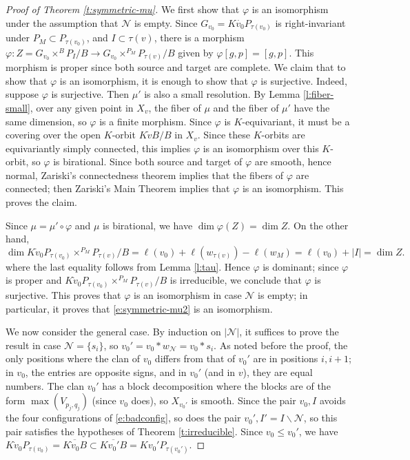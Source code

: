 \documentclass[11pt,letterpaper,reqno]{amsart}
\newcommand{\cN}{\mathcal N}
\numberwithin{equation}{section}
\theoremstyle{plain}
\theoremstyle{definition}
\theoremstyle{remark}
\begin{document}
\begin{proof}[Proof of Theorem \ref{t:symmetric-mu}]
We first show that $\varphi$ is an isomorphism under the assumption that $\cN$ is empty.  
Since $G_{v_0} = K \dot{v_0} P_{\tau(v_0)}$  is right-invariant under $P_M \subset P_{\tau(v_0)}$,
and $I \subset \tau(v)$, there is a morphism $\varphi: Z = G_{v_0} \times^B P_I/B \to G_{v_0} \times^{P_M} P_{\tau(v)}/B$
given by \(\varphi[g,p]=[g,p]\).  This morphism is proper since both source and target are complete.
We claim that to show that $\varphi$ is an isomorphism, it is enough to show that $\varphi$ is surjective.
Indeed, suppose $\varphi$ is surjective.  Then $\mu'$ is also a small resolution. By Lemma \ref{l:fiber-small},
over any given point in $X_v$, the fiber of $\mu$ and the fiber of $\mu'$ have the same dimension, 
so $\varphi$ is a finite morphism.
Since $\varphi$ is $K$-equivariant, it must be a covering
over the open $K$-orbit $K \dot{v} B/B$ in $X_v$.  Since these $K$-orbits are equivariantly simply connected, this implies $\varphi$ is an isomorphism over
this $K$-orbit, so $\varphi$ is birational.  Since both source and target of $\varphi$ are smooth, hence
normal, Zariski's connectedness theorem implies that the fibers of $\varphi$ are connected; then Zariski's Main Theorem implies that
$\varphi$ is an isomorphism.  This proves the claim.

Since $\mu = \mu' \circ \varphi$ and $\mu$ is birational, we have $\dim \varphi(Z) = \dim Z$.  On the
other hand,
\begin{equation} \label{e:dimension}
\dim K \dot{v}_0P_{\tau(v_0)}\times^{P_M} P_{\tau(v)}/B = \ell(v_0) + \ell(w_{\tau(v)}) - \ell(w_M) = \ell(v_0) + | I | = \dim Z.
\end{equation}
where the last equality follows from Lemma \ref{l:tau}.  Hence $\varphi$ is dominant; since $\varphi$ is proper
and $K\dot{v}_0P_{\tau(v_0)}\times^{P_M} P_{\tau(v)}/B$ is irreducible, we conclude that $\varphi$ is surjective.
This proves that $\varphi$ is an isomorphism in case $\cN$ is empty; in particular, it proves that  \eqref{e:symmetric-mu2} is an isomorphism.

We now consider the general case.  By induction on $|\cN|$, it suffices to prove the result in case $\cN = \{ s_{i} \}$,
so $v_0' = v_0 * w_{\cN} = v_0 * s_{i}$.  As noted before the proof, the only positions where
the clan of $v_0$ differs from that of $v_0'$ are in positions $i, i+1$; in $v_0$, the entries are opposite signs, and
in $v_0'$ (and in $v$), they are equal numbers.  The clan $v_0'$ has a block decomposition where
the blocks are of the form $\max(V_{p_j,q_j})$ (since $v_0$ does), so $X_{v_0'}$ is smooth.  
Since the pair $v_0, I$ avoids the four configurations of  \eqref{e:badconfig}, so does the pair $v_0', I' = I \smallsetminus \cN$,
so this pair satisfies the hypotheses of Theorem \ref{t:irreducible}.  Since $v_0\leq v_0'$,
we have $K \dot{v}_0 P_{\tau(v_0)} = \overline{K \dot{v}_0B} \subset\overline{K{v_{0}'}B} = K v_0' P_{\tau(v_0')}$.


\end{proof}
\end{document}
